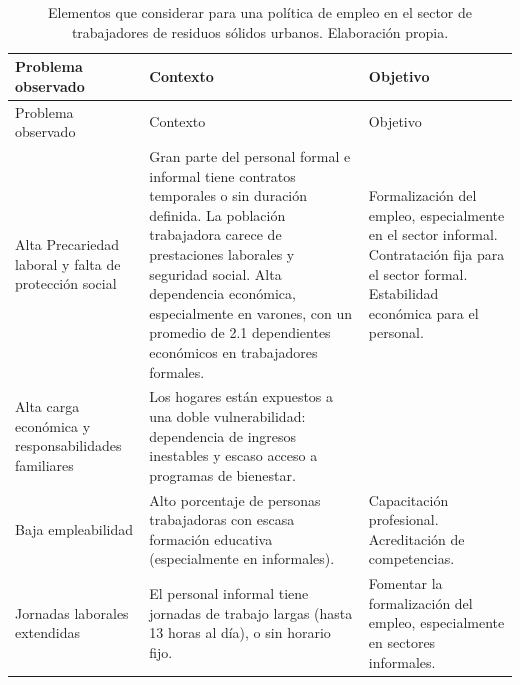 \documentclass[
  spanish,
  11.5pt,
  170mm x 240mmpaper,
]{scrbook}
\begin{document}
\begin{longtable}[]{@{}
  >{\raggedright\arraybackslash}p{}
  >{\raggedright\arraybackslash}p{}
  >{\raggedright\arraybackslash}p{}@{}}
\caption{Elementos que considerar para una política de empleo en el
sector de trabajadores de residuos sólidos urbanos. Elaboración
propia.}\label{tbl-3}\tabularnewline
\toprule\noalign{}
\begin{minipage}[b]{\linewidth}\raggedright
Problema observado
\end{minipage} & \begin{minipage}[b]{\linewidth}\raggedright
Contexto
\end{minipage} & \begin{minipage}[b]{\linewidth}\raggedright
Objetivo
\end{minipage} \\
\midrule\noalign{}
\endfirsthead
\toprule\noalign{}
\begin{minipage}[b]{\linewidth}\raggedright
Problema observado
\end{minipage} & \begin{minipage}[b]{\linewidth}\raggedright
Contexto
\end{minipage} & \begin{minipage}[b]{\linewidth}\raggedright
Objetivo
\end{minipage} \\
\midrule\noalign{}
\endhead
\bottomrule\noalign{}
\endlastfoot
Alta Precariedad laboral y falta de protección social & Gran parte del
personal formal e informal tiene contratos temporales o sin duración
definida. La población trabajadora carece de prestaciones laborales y
seguridad social. Alta dependencia económica, especialmente en varones,
con un promedio de 2.1 dependientes económicos en trabajadores formales.
& Formalización del empleo, especialmente en el sector informal.
Contratación fija para el sector formal. Estabilidad económica para el
personal. \\
Alta carga económica y responsabilidades familiares & Los hogares están
expuestos a una doble vulnerabilidad: dependencia de ingresos inestables
y escaso acceso a programas de bienestar. & \\
Baja empleabilidad & Alto porcentaje de personas trabajadoras con escasa
formación educativa (especialmente en informales). & Capacitación
profesional. Acreditación de competencias. \\
Jornadas laborales extendidas & El personal informal tiene jornadas de
trabajo largas (hasta 13 horas al día), o sin horario fijo. & Fomentar
la formalización del empleo, especialmente en sectores informales. \\
\end{longtable}
\end{document}
